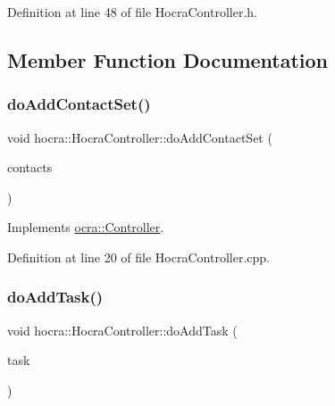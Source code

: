 Definition at line 48 of file Hocra\+Controller.\+h.



\subsection{Member Function Documentation}
\hypertarget{classhocra_1_1HocraController_a6292f35dbfe7f2292f018c51d492ace2}{}\label{classhocra_1_1HocraController_a6292f35dbfe7f2292f018c51d492ace2} 
\subsubsection{\texorpdfstring{do\+Add\+Contact\+Set()}{doAddContactSet()}}
{\footnotesize\ttfamily void hocra\+::\+Hocra\+Controller\+::do\+Add\+Contact\+Set (\begin{DoxyParamCaption}\item[{const \hyperlink{classocra_1_1ContactSet}{Contact\+Set} \&}]{contacts }\end{DoxyParamCaption})\hspace{0.3cm}{\ttfamily [virtual]}}



Implements \hyperlink{classocra_1_1Controller_acb11edc1ceaa89423c1e58f9cb38a9f7}{ocra\+::\+Controller}.



Definition at line 20 of file Hocra\+Controller.\+cpp.

\hypertarget{classhocra_1_1HocraController_a441fa7669cab7fb1c43c8544ea4b7e5f}{}\label{classhocra_1_1HocraController_a441fa7669cab7fb1c43c8544ea4b7e5f} 
\subsubsection{\texorpdfstring{do\+Add\+Task()}{doAddTask()}}
{\footnotesize\ttfamily void hocra\+::\+Hocra\+Controller\+::do\+Add\+Task (\begin{DoxyParamCaption}\item[{Task\+::\+Ptr}]{task }\end{DoxyParamCaption})\hspace{0.3cm}{\ttfamily [virtual]}}



